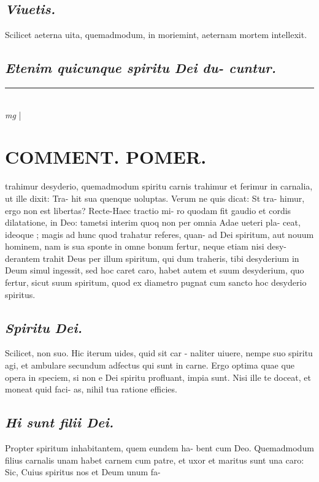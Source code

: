 \documentclass{article}
\begin{document}
\begin{pages}
\subsection*{\textit{Viuetis. }}\pstart Scilicet aeterna uita, quemadmodum, in moriemint, aeternam mortem intellexit.   \pend
{}
{}
\subsection*{\textit{Etenim quicunque spiritu Dei du- cuntur. }}
\vspace{0.5cm}\noindent
\vspace{0.2cm}\rule{1cm}{0.2pt}\\ 
\hspace{0.2cm}\textit{mg}
\footnotesize 
\normalsize| 
\section*{COMMENT. POMER.  }\pstart trahimur desyderio, quemadmodum spiritu carnis trahimur et ferimur in carnalia, ut ille dixit: Tra- hit sua quenque uoluptas. Verum ne quis dicat: St tra- himur, ergo non est libertas? Recte-Haec tractio mi- ro quodam fit gaudio et cordis dilatatione, in Deo: tametsi interim quoq non per omnia Adae ueteri pla- ceat, ideoque ; magis ad hunc quod trahatur referes, quan- ad Dei spiritum, aut nouum hominem, nam is sua sponte in omne bonum fertur, neque etiam nisi desy- derantem trahit Deus per illum spiritum, qui dum traheris, tibi desyderium in Deum simul ingessit, sed hoc caret caro, habet autem et suum desyderium, quo fertur, sicut suum spiritum, quod ex diametro pugnat cum sancto hoc desyderio spiritus.   \pend
{}
{}
\subsection*{\textit{Spiritu Dei. }}\pstart Scilicet, non suo. Hic iterum uides, quid sit car - naliter uiuere, nempe suo spiritu agi, et ambulare secundum adfectus qui sunt in carne. Ergo optima quae que opera in speciem, si non e Dei spiritu profluant, impia sunt. Nisi ille te doceat, et moneat quid faci- as, nihil tua ratione efficies.   \pend
{}
{}
\subsection*{\textit{Hi sunt filii Dei. }}\pstart Propter spiritum inhabitantem, quem eundem ha- bent cum Deo. Quemadmodum filius carnalis unam habet carnem cum patre, et uxor et maritus sunt una caro: Sic, Cuius spiritus nos et Deum unum fa-  \pend

\end{pages}
\end{document}

